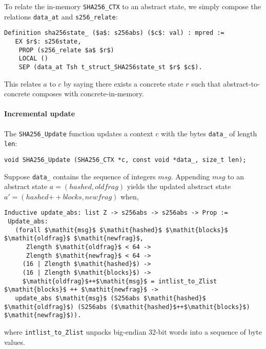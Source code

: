 \documentclass[prodmode,acmtoplas]{acmsmall}
\begin{document}
To relate the in-memory \lstinline{SHA256_CTX}
to an abstract state, we simply compose the
relations \lstinline{data_at} and \lstinline{s256_relate}:
\begin{lstlisting}
Definition sha256state_ ($a$: s256abs) ($c$: val) : mpred :=
   EX $r$: s256state, 
    PROP (s256_relate $a$ $r$)
    LOCAL ()
    SEP (data_at Tsh t_struct_SHA256state_st $r$ $c$).
\end{lstlisting}
This relates $a$ to $c$ by saying there exists a concrete state $r$
such that abstract-to-concrete composes with concrete-in-memory.

\paragraph{Incremental update}
The \lstinline{SHA256_Update} function
updates a context $c$ with the bytes \lstinline{data_}
of length \lstinline{len}:
\begin{verbatim}
void SHA256_Update (SHA256_CTX *c, const void *data_, size_t len);
\end{verbatim}
Suppose \lstinline{data_} contains
the sequence of integers $\mathit{msg}$.
Appending $\mathit{msg}$ to an abstract state 
$a=(\mathit{hashed},\mathit{oldfrag})$
yields the updated abstract state 
$a'=(\mathit{hashed}\mathtt{++}\mathit{blocks},\mathit{newfrag})$
when,
\begin{lstlisting}
Inductive update_abs: list Z -> s256abs -> s256abs -> Prop :=
 Update_abs:
   (forall $\mathit{msg}$ $\mathit{hashed}$ $\mathit{blocks}$ $\mathit{oldfrag}$ $\mathit{newfrag}$,
      Zlength $\mathit{oldfrag}$ < 64 ->
      Zlength $\mathit{newfrag}$ < 64 ->
     (16 | Zlength $\mathit{hashed}$) ->
     (16 | Zlength $\mathit{blocks}$) -> 
     $\mathit{oldfrag}$++$\mathit{msg}$ = intlist_to_Zlist $\mathit{blocks}$ ++ $\mathit{newfrag}$ ->
   update_abs $\mathit{msg}$ (S256abs $\mathit{hashed}$ $\mathit{oldfrag}$) (S256abs ($\mathit{hashed}$++$\mathit{blocks}$) $\mathit{newfrag}$)).
\end{lstlisting}
where \lstinline{intlist_to_Zlist} unpacks big-endian 32-bit words
into a sequence of byte values.
\end{document}
